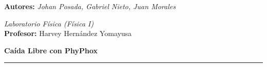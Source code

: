 \begin{@twocolumntrue}
\begin{minipage}{0.75\textwidth}
\begin{center}
            \normalsize{\textbf{Autores: }\textit{Johan Posada, Gabriel Nieto, Juan Morales}} %
            \vspace{2mm}
    
            \normalsize{\textit{Laboratorio Física (Física I) }}\\
            \normalsize{\textbf{Profesor: } Harvey Hernández Yomayusa}
            \vspace{2mm}

            \normalsize{\textbf{Caída Libre con PhyPhox}}\\
        \end{center}
    \end{minipage}
\noindent\textcolor{rojopro}{\rule{\textwidth}{3pt}}
\end{@twocolumntrue}
